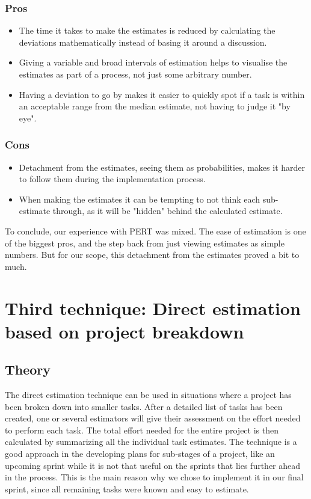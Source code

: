 \subsubsection{Pros}
\begin{itemize}
\item The time it takes to make the estimates is reduced by calculating the deviations mathematically instead of basing it around a discussion. 
\item Giving a variable and broad intervals of estimation helps to visualise the estimates as part of a process, not just some arbitrary number.
\item Having a deviation to go by makes it easier to quickly spot if a task is within an acceptable range from the median estimate, not having to judge it "by eye".

\end{itemize}

\subsubsection{Cons}
\begin{itemize}
\item Detachment from the estimates, seeing them as probabilities, makes it harder to follow them during the implementation process.
\item When making the estimates it can be tempting to not think each sub-estimate through, as it will be "hidden" behind the calculated estimate.

\end{itemize}

To conclude, our experience with PERT was mixed. The ease of estimation is one of the biggest pros, and the step back from just viewing estimates as simple numbers. But for our scope, this detachment from the estimates proved a bit to much.

\section{Third technique: Direct estimation based on project breakdown}
\subsection{Theory}
The direct estimation technique can be used in situations where a project has been broken down into smaller tasks. After a detailed list of tasks has been created, one or several estimators will give their assessment on the effort needed to perform each task. The total effort needed for the entire project is then calculated by summarizing all the individual task estimates.
The technique is a good approach in the developing plans for sub-stages of a project, like an upcoming sprint while it is not that useful on the sprints that lies further ahead in the process. This is the main reason why we chose to implement it in our final sprint, since all remaining tasks were known and easy to estimate.


